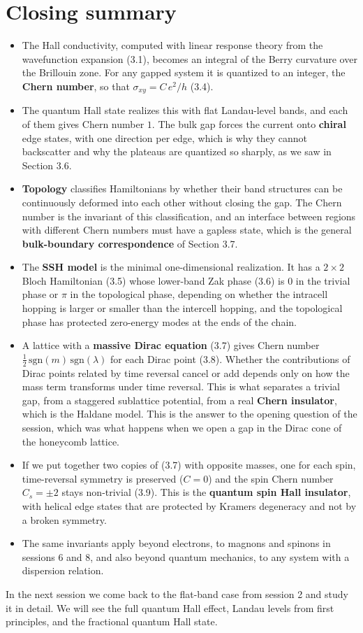 \section{Closing summary}

\begin{itemize}
\item The Hall conductivity, computed with linear response theory from the wavefunction expansion
  (3.1), becomes an integral of the Berry curvature over the Brillouin zone. For any gapped system it
  is quantized to an integer, the \textbf{Chern number}, so that $\sigma_{xy} = C\,e^2/h$ (3.4).
\item The quantum Hall state realizes this with flat Landau-level bands, and each of them gives Chern
  number $1$. The bulk gap forces the current onto \textbf{chiral} edge states, with one direction per
  edge, which is why they cannot backscatter and why the plateaus are quantized so sharply, as we saw
  in Section 3.6.
\item \textbf{Topology} classifies Hamiltonians by whether their band structures can be continuously
  deformed into each other without closing the gap. The Chern number is the invariant of this
  classification, and an interface between regions with different Chern numbers must have a gapless
  state, which is the general \textbf{bulk-boundary correspondence} of Section 3.7.
\item The \textbf{SSH model} is the minimal one-dimensional realization. It has a $2\times 2$ Bloch
  Hamiltonian (3.5) whose lower-band Zak phase (3.6) is $0$ in the trivial phase or $\pi$ in the
  topological phase, depending on whether the intracell hopping is larger or smaller than the
  intercell hopping, and the topological phase has protected zero-energy modes at the ends of the
  chain.
\item A lattice with a \textbf{massive Dirac equation} (3.7) gives Chern number $\tfrac12\,
  \mathrm{sgn}(m)\,\mathrm{sgn}(\lambda)$ for each Dirac point (3.8). Whether the contributions of
  Dirac points related by time reversal cancel or add depends only on how the mass term transforms
  under time reversal. This is what separates a trivial gap, from a staggered sublattice potential,
  from a real \textbf{Chern insulator}, which is the Haldane model. This is the answer to the opening
  question of the session, which was what happens when we open a gap in the Dirac cone of the
  honeycomb lattice.
\item If we put together two copies of (3.7) with opposite masses, one for each spin, time-reversal
  symmetry is preserved ($C=0$) and the spin Chern number $C_s=\pm2$ stays non-trivial (3.9). This is
  the \textbf{quantum spin Hall insulator}, with helical edge states that are protected by Kramers
  degeneracy and not by a broken symmetry.
\item The same invariants apply beyond electrons, to magnons and spinons in sessions 6 and 8, and also
  beyond quantum mechanics, to any system with a dispersion relation.
\end{itemize}

In the next session we come back to the flat-band case from session 2 and study it in detail. We will
see the full quantum Hall effect, Landau levels from first principles, and the fractional quantum Hall
state.
